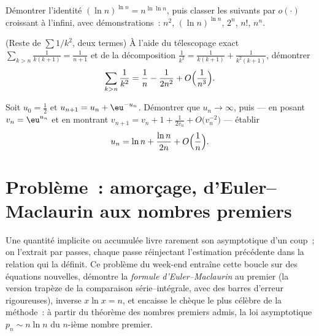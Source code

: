 \begin{exercise}[$\star$]\label{exo:b2:comparison:10}
Démontrer l'identité $(\ln n)^{\ln n} = n^{\ln\ln n}$, puis classer les
suivants par  $o(\cdot)$ croissant à l'infini, avec
démonstrations~: $n^2$, $(\ln n)^{\ln n}$, $2^n$, $n!$, $n^n$.
\end{exercise}

\begin{exercise}[$\star\star$]\label{exo:b2:comparison:11}
(Reste de $\sum 1/k^2$, deux termes) À l'aide du télescopage exact
$\sum_{k > n} \frac{1}{k(k+1)} = \frac{1}{n+1}$ et de la
décomposition $\frac1{k^2} = \frac{1}{k(k+1)} +
\frac{1}{k^2(k+1)}$, démontrer
\[
\sum_{k > n} \frac{1}{k^2}
= \frac1n - \frac{1}{2n^2} + O\Bigl(\frac{1}{n^3}\Bigr).
\]
\end{exercise}

\begin{exercise}[$\star\star\star$]\label{exo:b2:comparison:12}
Soit $u_0 = \frac12$ et $u_{n+1} = u_n + \eu^{-u_n}$. Démontrer que
$u_n \to \infty$, puis --- en posant $v_n = \eu^{u_n}$ et en montrant
$v_{n+1} = v_n + 1 + \frac{1}{2v_n} + O\bigl(v_n^{-2}\bigr)$ ---
établir
\[
u_n = \ln n + \frac{\ln n}{2n} + O\Bigl(\frac1n\Bigr).
\]
\end{exercise}

\section{Problème~: amorçage, d'Euler--Maclaurin aux nombres
premiers}

Une quantité implicite ou accumulée livre rarement son
asymptotique d'un coup~; on l'extrait par passes, chaque passe
réinjectant l'estimation précédente dans la relation qui la définit.
Ce problème du week-end entraîne cette boucle sur des équations
nouvelles, démontre la \emph{formule d'Euler--Maclaurin} au premier
 (la version trapèze de la comparaison série--intégrale, avec des
barres d'erreur rigoureuses), inverse $x\ln x = n$, et encaisse le
chèque le plus célèbre de la méthode~: à partir du théorème des
nombres premiers admis, la loi asymptotique $p_n \sim n\ln n$ du
$n$-ième nombre premier.

